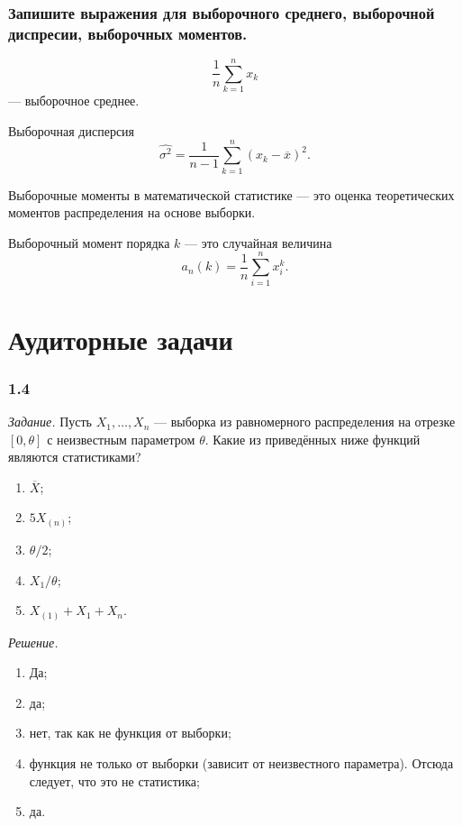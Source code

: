 \subsubsection*{Запишите выражения для выборочного среднего, выборочной диспресии,
                выборочных моментов.}

$$ \frac{1}{n} \sum \limits_{k = 1}^n x_k$$
--- выборочное среднее.

Выборочная дисперсия
$$ \hat{ \sigma^2} =
  \frac{1}{n - 1} \sum \limits_{k = 1}^n \left( x_k - \overline{x} \right)^2.$$

Выборочные моменты в математической статистике ---
это оценка теоретических моментов распределения на основе выборки.

Выборочный момент порядка $k$ --- это случайная величина
$$a_n \left( k \right) =
   \frac{1}{n} \sum \limits_{i = 1}^n x_i^k.$$

\section*{Аудиторные задачи}

\subsubsection{1.4}

\textit{Задание.}
Пусть $X_1, \dotsc, X_n$ ---
выборка из равномерного распределения на отрезке $ \left[0, \theta \right] $
с неизвестным параметром $ \theta $.
Какие из приведённых ниже функций являются статистиками?
\begin{enumerate}[label=\alph*)]
  \item $ \overline{X}$;
  \item $5X_{ \left( n \right) }$;
  \item $ \theta / 2$;
  \item $X_1 / \theta $;
  \item $X_{ \left( 1 \right) } + X_1 + X_n$.
\end{enumerate}

\textit{Решение.}
\begin{enumerate}[label=\alph*)]
  \item Да;
  \item да;
  \item нет, так как не функция от выборки;
  \item функция не только от выборки (зависит от неизвестного параметра).
  Отсюда следует, что это не статистика;
  \item да.
\end{enumerate}

